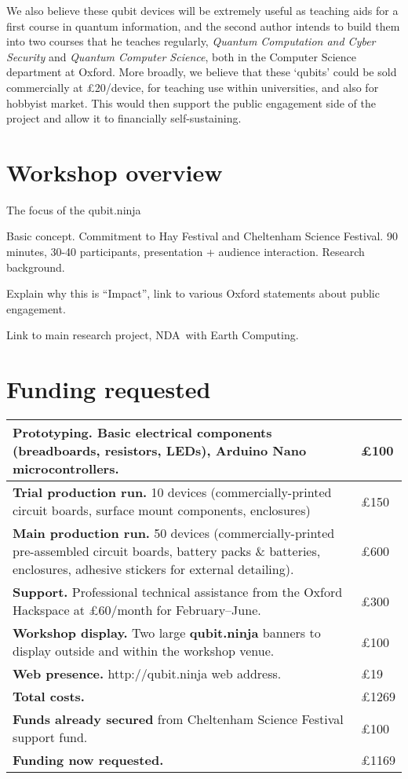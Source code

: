 \documentclass[a4paper, 12pt]{article}
\begin{document}
We also believe these qubit devices will be extremely useful as teaching aids for a first course in quantum information, and the second author intends to build them into two courses that he teaches regularly, \textit{Quantum Computation and Cyber Security} and \textit{Quantum Computer Science}, both in the Computer Science department at Oxford. More broadly, we believe that these `qubits' could be sold commercially at \pounds 20/device, for teaching use within universities, and also for hobbyist market. This would then support the public engagement side of the project and allow it to financially self-sustaining.


\section*{Workshop overview}

The focus of the qubit.ninja 

Basic concept. Commitment to Hay Festival and Cheltenham Science Festival. 90 minutes, 30-40 participants, presentation + audience interaction. Research background.

Explain why this is ``Impact'', link to various Oxford statements about public engagement.

Link to main research project, NDA\ with Earth Computing.


\section*{Funding requested}

\def\arraystretch{1.5}%
\begin{tabular}{|p{13cm}|l|}
\hline
\raggedright
\textbf{Prototyping.} Basic electrical components (breadboards, resistors, LEDs), Arduino Nano microcontrollers. & \pounds 100
\\\hline\raggedright
\textbf{Trial production run.} 10 devices (commercially-printed circuit boards, surface mount components, enclosures) & \pounds 150
\\\hline\raggedright
\textbf{Main production run.} 50 devices (commercially-printed pre-assembled circuit boards, battery packs \& batteries, enclosures, adhesive stickers for external detailing). & \pounds 600 
\\\hline\raggedright
\textbf{Support.} Professional technical assistance from the Oxford Hackspace at \pounds 60/month for February--June. & \pounds 300
\\\hline\raggedright
\textbf{Workshop display.} Two large \textbf{qubit.ninja} banners to display outside and within the workshop venue.
& \pounds 100
\\\hline\raggedright
\textbf{Web presence.} http://qubit.ninja web address.
& \pounds19
\\\hline\raggedright
\textbf{Total costs.} & \pounds 1269
\\\hline\raggedright
\textbf{Funds already secured} from Cheltenham Science Festival support fund. & \pounds 100
\\\hline\raggedright
\textbf{Funding now requested.} & \pounds 1169
\\\hline
\end{tabular}
\end{document}
